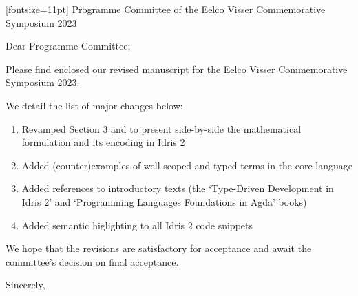 \documentclass[UKenglish,final,a4paper,oneside]{scrlttr2}
\begin{document}
\begin{letter}[fontsize=11pt]%
  {%
    Programme Committee of the Eelco Visser Commemorative Symposium 2023
  }

  \opening{Dear Programme Committee;}

  Please find enclosed our revised manuscript for the Eelco Visser Commemorative Symposium 2023.

  We detail the list of major changes below:

  \begin{enumerate}
    \item Revamped Section 3 and  to present side-by-side
          the mathematical formulation and its encoding in Idris 2
    \item Added (counter)examples of well scoped and typed terms in the core language
    \item Added references to introductory texts
       (the `Type-Driven Development in Idris 2'
       and `Programming Languages Foundations in Agda' books)
    \item Added semantic higlighting to all Idris 2 code snippets
  \end{enumerate}

  We hope that the revisions are satisfactory for acceptance and await the committee's decision on final acceptance.

\closing{Sincerely,}
\end{letter}
\end{document}

